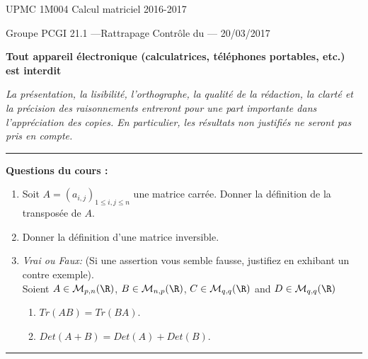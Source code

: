 \documentclass[11pt]{article}
\begin{document}
{\large UPMC \hfill 1M004 Calcul matriciel \hfill 2016-2017}

\vskip -3mm
\noindent \textbf{\hrulefill}

\vskip 1mm

\centerline{
{\large Groupe PCGI 21.1 \hspace{1.7 cm} ---Rattrapage Contrôle du --- \hspace{3.5 cm}  20/03/2017}}


\vskip -2mm
\noindent \textbf{\hrulefill}



\vskip 2mm

\centerline{\textbf{Tout appareil \'electronique (calculatrices, t\'el\'ephones portables, etc.) est interdit}}

\vskip 2mm



{\sl  La pr\'esentation, la lisibilit\'e, l'orthographe, la
 qualit\'e de la r\'edaction, la clart\'e et la pr\'ecision des
 raisonnements entreront pour une part importante dans
 l'appr\'eciation des copies. En particulier, les r\'esultats non
 justifi\'es ne seront pas pris en compte. }


\vskip 3mm
\hrule

\vskip 3mm

\textbf{Questions du cours :} 
\begin{enumerate}
\item  Soit $A=(a_{i,j})_{1\leq i,j \leq n}$ une matrice carrée. Donner la définition de la transposée de $A$.
\item Donner la définition d'une matrice inversible.
\item  \emph{Vrai ou Faux:} (Si une assertion vous semble fausse, justifiez en exhibant un contre exemple).\\
 Soient $A \in \mathcal{M}_{p,n}(\R)$, $B \in \mathcal{M}_{n,p}(\R)$, $C \in \mathcal{M}_{q,q}(\R)$ and $D \in \mathcal{M}_{q,q}(\R)$
\begin{enumerate}
\item $Tr(AB) = Tr(BA)$.
\item $Det(A+B) = Det(A) + Det(B)$.
\end{enumerate}
       
\end{enumerate}
\vskip 0.2cm
  \hrule
\vskip 2mm
\end{document}
